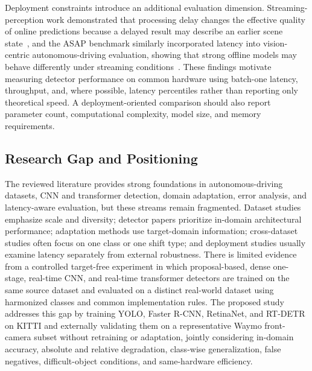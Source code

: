 Deployment constraints introduce an additional evaluation dimension. Streaming-perception
work demonstrated that processing delay changes the effective quality of online
predictions because a delayed result may describe an earlier scene
state~\cite{yang2022streaming}, and the ASAP benchmark similarly incorporated latency into
vision-centric autonomous-driving evaluation, showing that strong offline models may behave
differently under streaming conditions~\cite{wang2023asap}. These findings motivate
measuring detector performance on common hardware using batch-one latency, throughput,
and, where possible, latency percentiles rather than reporting only theoretical speed. A
deployment-oriented comparison should also report parameter count, computational
complexity, model size, and memory requirements.

\subsection{Research Gap and Positioning}
\label{sec:related_gap}

The reviewed literature provides strong foundations in autonomous-driving datasets, CNN
and transformer detection, domain adaptation, error analysis, and latency-aware
evaluation, but these streams remain fragmented. Dataset studies emphasize scale and
diversity; detector papers prioritize in-domain architectural performance; adaptation
methods use target-domain information; cross-dataset studies often focus on one class or
one shift type; and deployment studies usually examine latency separately from external
robustness. There is limited evidence from a controlled target-free experiment in which
proposal-based, dense one-stage, real-time CNN, and real-time transformer detectors are
trained on the same source dataset and evaluated on a distinct real-world dataset using
harmonized classes and common implementation rules. The proposed study addresses this gap
by training YOLO, Faster R-CNN, RetinaNet, and RT-DETR on KITTI and externally validating
them on a representative Waymo front-camera subset without retraining or adaptation,
jointly considering in-domain accuracy, absolute and relative degradation, class-wise
generalization, false negatives, difficult-object conditions, and same-hardware
efficiency.
